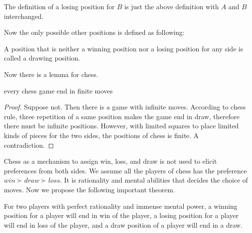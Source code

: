 The definition of a losing position for $B$ is just the above definition with $A$ and $B$ interchanged.

Now the only possible other positions is defined as following:
\begin{definition}
A position that is neither a winning position nor a losing position for any side is called a drawing position.
\end{definition}

Now there is a lemma for chess.
\begin{lemma}
every chess game end in finite moves
\end{lemma}

\begin{proof}
Suppose not. Then there is a game with infinite moves.
According to chess rule, three repetition of a same position makes the game end in draw, therefore there must be infinite positions.
However, with limited squares to place limited kinds of pieces for the two sides, the positions of chess is finite. A contradiction. 
\end{proof}

Chess as a mechanism to assign win, loss, and draw is not used to elicit preferences from both sides.  We assume all the players of chess has the preference $win\succ draw \succ loss$. 
It is rationality and mental abilities that decides the choice of moves. Now we propose the following important theorem. 

\begin{thm}

For two players with perfect rationality and immense mental power, a winning position for a player will end in win of the player, a losing position for a player will end in loss of the player, and a draw position of a player will end in a draw.

\end{thm}


